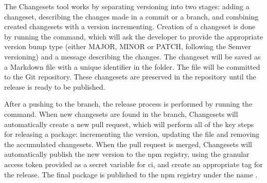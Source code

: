 The Changesets tool works by separating versioning into two stages: adding a changeset, describing the changes made in a commit or a branch, and combining created changesets with a version incrementing. Creation of a changeset is done by running the  command, which will ask the developer to provide the appropriate version bump type (either MAJOR, MINOR or PATCH, following the Semver versioning) and a message describing the changes. The changeset will be saved as a Markdown file with a unique identifier in the  folder. The file will be committed to the Git repository. These changesets are preserved in the repository until the release is ready to be published.

After a pushing to the  branch, the release process is performed by running the  command. When new changesets are found in the  branch, Changesets will automatically create a new pull request, which will perform all of the key steps for releasing a package: incrementing the version, updating the  file and removing the accumulated changesets. When the pull request is merged, Changesets will automatically publish the new version to the \acrshort{npm} registry, using the granular access token provided as a secret variable for \acrshort{ci}, and create an appropriate  tag for the release. The final package is published to the \acrshort{npm} registry under the name  \cite{Tsmathevaluate2023}. 